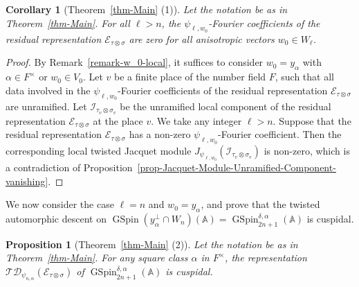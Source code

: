 \documentclass[12pt]{amsart}
\newcommand{\A}{\mathbb{A}}
\newcommand{\TD}{\mathcal{TD}}
\newcommand{\CE}{{\mathcal{E}}}
\newtheorem{proposition}[theorem]{Proposition}%
\newtheorem{corollary}[theorem]{Corollary}%
\theoremstyle{remark}
\DeclareMathOperator{\GSpin}{GSpin}
\begin{document}
\begin{corollary}[Theorem~\ref{thm-Main} (1)]
\label{cor-MainThm-Part1}
Let the notation be as in Theorem~\ref{thm-Main}. For all $\ell>n$, the $\psi_{\ell,w_0}$-Fourier coefficients of the residual representation $\CE_{\tau\otimes\sigma}$ are zero for all anisotropic vectors $w_0\in W_{\ell}$. 
\end{corollary}

\begin{proof}
By Remark~\ref{remark-w_0-local}, it suffices to consider $w_0=y_{\alpha}$ with $\alpha\in F^\times$ or $w_0\in V_0$. Let $v$ be a finite place of the number field $F$, such that all data involved in the $\psi_{\ell,w_0}$-Fourier coefficients of the residual representation $\CE_{\tau\otimes\sigma}$ are unramified. Let $\mathcal{I}_{\tau_v\otimes\sigma_v}$ be the unramified local component of the residual representation $\CE_{\tau\otimes\sigma}$ at the place $v$. We take any integer $\ell>n$. Suppose that the residual representation $\CE_{\tau\otimes\sigma}$ has a non-zero $\psi_{\ell,w_0}$-Fourier coefficient. Then the corresponding local twisted Jacquet module $J_{\psi_{\ell,w_0}}(\mathcal{I}_{\tau_v\otimes\sigma_v})$ is non-zero, which is a contradiction of Proposition~\ref{prop-Jacquet-Module-Unramified-Component-vanishing}. 
\end{proof}


We now consider the case $\ell=n$ and $w_0=y_{\alpha}$, and prove that the twisted automorphic descent on $\GSpin(y_{\alpha}^\perp \cap W_{n})(\A)=\GSpin^{\delta,\alpha}_{2n+1}(\A)$ is cuspidal. 

\begin{proposition}[Theorem~\ref{thm-Main} (2)]
\label{prop-cuspidality}
Let the notation be as in Theorem~\ref{thm-Main}. For any square class $\alpha$ in $F^\times$, the representation $\TD_{\psi_{n,\alpha}}(\CE_{\tau\otimes\sigma})$ of $\GSpin^{\delta,\alpha}_{2n+1}(\A)$ is cuspidal.
\end{proposition}
\end{document}
